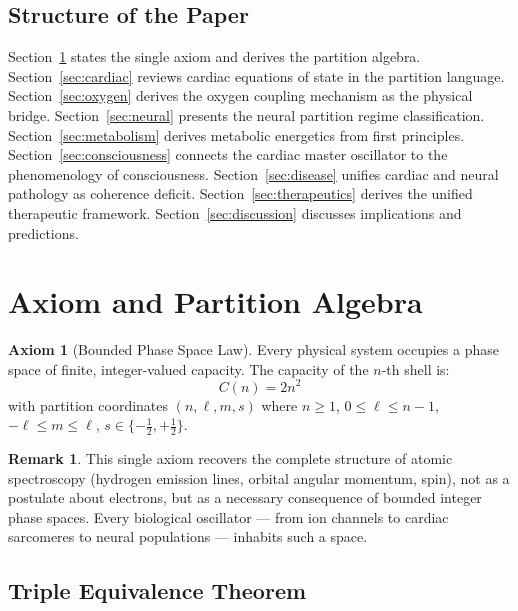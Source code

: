 \documentclass[12pt,a4paper]{article}
\theoremstyle{definition}
\newtheorem{axiom}{Axiom}
\newtheorem{remark}{Remark}
\begin{document}
\subsection{Structure of the Paper}

Section~\ref{sec:axiom} states the single axiom and derives the partition algebra.
Section~\ref{sec:cardiac} reviews cardiac equations of state in the partition language.
Section~\ref{sec:oxygen} derives the oxygen coupling mechanism as the physical bridge.
Section~\ref{sec:neural} presents the neural partition regime classification.
Section~\ref{sec:metabolism} derives metabolic energetics from first principles.
Section~\ref{sec:consciousness} connects the cardiac master oscillator to the
phenomenology of consciousness.
Section~\ref{sec:disease} unifies cardiac and neural pathology as coherence deficit.
Section~\ref{sec:therapeutics} derives the unified therapeutic framework.
Section~\ref{sec:discussion} discusses implications and predictions.

\section{Axiom and Partition Algebra}
\label{sec:axiom}

\begin{axiom}[Bounded Phase Space Law]
\label{ax:bpsl}
Every physical system occupies a phase space of finite, integer-valued capacity.
The capacity of the $n$-th shell is:
\begin{equation}
\boxed{C(n) = 2n^2}
\end{equation}
with partition coordinates $(n, \ell, m, s)$ where $n \geq 1$,
$0 \leq \ell \leq n-1$, $-\ell \leq m \leq \ell$, $s \in \{-\tfrac{1}{2}, +\tfrac{1}{2}\}$.
\end{axiom}

\begin{remark}
This single axiom recovers the complete structure of atomic spectroscopy
(hydrogen emission lines, orbital angular momentum, spin), not as a
postulate about electrons, but as a necessary consequence of bounded integer
phase spaces. Every biological oscillator — from ion channels to cardiac
sarcomeres to neural populations — inhabits such a space.
\end{remark}

\subsection{Triple Equivalence Theorem}
\end{document}
